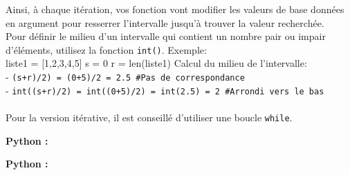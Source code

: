 \begin{Exercice}[20 minutes]
\begin{conseil}
        Ainsi, à chaque itération, vos fonction vont modifier les valeurs de base données en argument pour resserrer l'intervalle jusqu'à trouver la valeur recherchée.\\        
        Pour définir le milieu d'un intervalle qui contient un nombre pair ou impair d'éléments, utilisez la fonction \lstinline{int()}. Exemple:\\
        liste1 = [1,2,3,4,5]
        s = 0 \quad r = len(liste1)
        Calcul du milieu de l'intervalle:\\
        - \lstinline{(s+r)/2) = (0+5)/2 = 2.5 #Pas de correspondance}\\
        - \lstinline{int((s+r)/2) = int((0+5)/2) = int(2.5) = 2 #Arrondi vers le bas}\\\\
        
        Pour la version itérative, il est conseillé d'utiliser une boucle \lstinline{while}.

    \end{conseil}

    \begin{solution}
        \textbf{Python :}
        
    \end{solution}
    \begin{solution}
        \textbf{Python :}
        
    \end{solution}

\end{Exercice}


